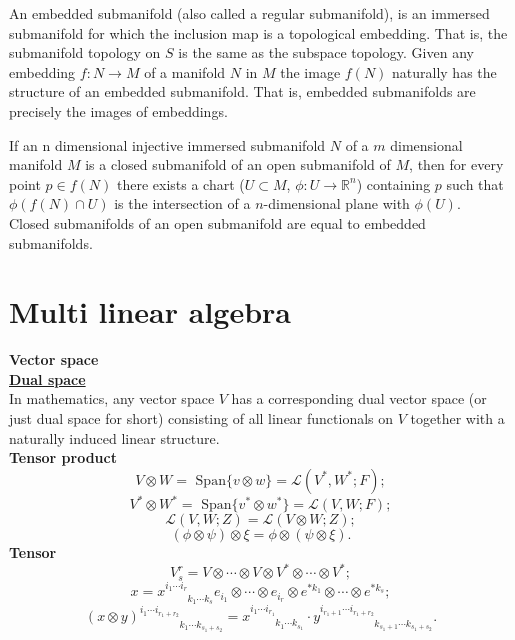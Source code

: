 \begin{newdef}
An embedded submanifold (also called a regular submanifold), is an immersed submanifold for which the inclusion map is a topological embedding. That is, the submanifold topology on $S$ is the same as the subspace topology. Given any embedding $f:N \to M$ of a manifold $N$ in $M$ the image $f(N)$ naturally has the structure of an embedded submanifold. That is, embedded submanifolds are precisely the images of embeddings.
\end{newdef}

\begin{newprop}[]
If an n dimensional injective immersed submanifold $N$ of a $m$ dimensional manifold $M$ is a closed submanifold of an open submanifold of $M$, then for every point $p \in f(N)$ there exists a chart ($U \subset M$, $\phi:U \to \mathbb{R}^n $) containing $p$ such that $\phi(f(N) \cap U)$ is the intersection of a $n$-dimensional plane with $\phi(U)$.\\
Closed submanifolds of an open submanifold are equal to embedded submanifolds.
\end{newprop}

\section{Multi linear algebra}
\begin{newdef}[Tensor]
\textbf{Vector space}\\
\href{https://en.wikipedia.org/wiki/Dual_space}{\textbf{Dual space}}\\
In mathematics, any vector space $V$ has a corresponding dual vector space (or just dual space for short) consisting of all linear functionals on $V$ together with a naturally induced linear structure.\\
\textbf{Tensor product}
\[V \otimes W = \mbox{ Span}\{ v \otimes w \} = \mathcal{L}(V^*,W^*;F);\]
\[V^* \otimes W^* = \mbox{ Span}\{ v^* \otimes w^* \} = \mathcal{L}(V,W;F);\]
\[\mathcal{L}(V,W;Z)=\mathcal{L}(V \otimes W;Z);\]
\[(\phi \otimes \psi)\otimes \xi = \phi \otimes (\psi \otimes \xi).\]
\textbf{Tensor}
\[V_s^r = V \otimes \cdots \otimes V \otimes V^* \otimes \cdots \otimes V^*;\]
\[x=x^{i_1 \cdots i_r}_{\phantom{i_1 \cdots i_r} k_1 \cdots k_s} e_{i_1} \otimes \cdots \otimes e_{i_r} \otimes e^{*k_1} \otimes \cdots \otimes e^{*k_s};\]
\[(x \otimes y)^{i_1 \cdots i_{r_1+r_2}}_{\phantom{i_1 \cdots i_{r_1+r_2}} k_1 \cdots k_{s_1+s_2}} = 
x^{i_1 \cdots i_{r_1}}_{\phantom{i_1 \cdots i_{r_1}}k_1 \cdots k_{s_1}} \cdot y^{i_{r_1+1} \cdots i_{r_1+r_2}}_{\phantom{i_{r_1+1} \cdots i_{r_1+r_2}}k_{s_1+1} \cdots k_{s_1+s_2}}.\]
\end{newdef}

